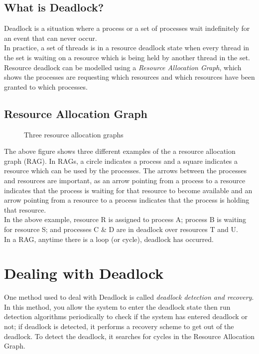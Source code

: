 \subsection{What is Deadlock?}
Deadlock is a situation where a process or a set of processes wait indefinitely for an event that can never occur.\\

In practice, a set of threads is in a resource deadlock state when every thread in the set is waiting on a resource which is being held by another thread in the set.\\

Resource deadlock can be modelled using a \textit{Resource Allocation Graph}, which shows the processes are requesting which resources and which resources have been granted to which processes.

\subsection{Resource Allocation Graph}
\begin{figure}[H]
    \centering
    
    \caption{Three resource allocation graphs}
\end{figure}
The above figure shows three different examples of the a resource allocation graph (RAG). In RAGs, a circle indicates a process and a square indicates a resource which can be used by the processes. The arrows between the processes and resources are important, as an arrow pointing from a process to a resource indicates that the process is waiting for that resource to become available and an arrow pointing from a resource to a process indicates that the process is holding that resource.\\

In the above example, resource R is assigned to process A; process B is waiting for resource S; and processes C \& D are in deadlock over resources T and U.\\

In a RAG, anytime there is a loop (or cycle), deadlock has occurred.

\section{Dealing with Deadlock}
One method used to deal with Deadlock is called \textit{deadlock detection and recovery}. In this method, you allow the system to enter the deadlock state then run detection algorithms periodically to check if the system has entered deadlock or not; if deadlock is detected, it performs a recovery scheme to get out of the deadlock. To detect the deadlock, it searches for cycles in the Resource Allocation Graph.

